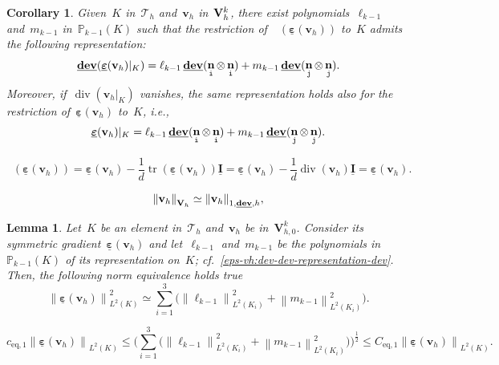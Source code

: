 \documentclass[10pt,a4paper]{amsart}
\newtheorem{lemma}{Lemma}
\newtheorem{corollary}{Corollary}
\newcommand{\Ceqone}{C_{\text{eq},1}}
\newcommand{\Idbf}{\underline{\mathbf{I}}}
\newcommand{\K}{K}
\newcommand{\Ki}{{\K_i}}
\newcommand{\Ltwo}{L^2}
\newcommand{\Norm}[1]{{\left\|{#1} \right\|}}
\newcommand{\Pbbkmo}{\mathbb{P}_{k-1}}
\newcommand{\Tauh}{\mathcal{T}_h}
\newcommand{\Vbf}{\mathbf{V}}
\newcommand{\Vh}{{\bf{V}}_h}
\newcommand{\Vhk}{\Vh^k}
\newcommand{\Vhkz}{\Vbf_{h,0}^k}
\newcommand{\ceqone}{c_{\text{eq},1}}
\DeclareMathOperator{\dev}{\underline{\mathbf{dev}}}
\DeclareMathOperator{\dive}{div}
\newcommand{\epsbfun}{\underline{\boldsymbol{\varepsilon}}}
\newcommand{\itt}{\mathtt{i}}
\newcommand{\jtt}{\mathtt{j}}
\newcommand{\lkmo}{\ell_{k-1}}
\newcommand{\mkmo}{m_{k-1}}
\DeclareMathOperator{\norm}{\bf{n}}
\newcommand{\normitt}{\norm_{\itt}}
\newcommand{\normjtt}{\norm_{\jtt}}
\DeclareMathOperator{\tr}{tr}
\newcommand{\vbfh}{\mathbf{v}_h}
\begin{document}
\begin{corollary} \label{corollary:decomposition-epsvh}
Given~$\K$ in~$\Tauh$
and~$\vbfh$ in~$\Vhk$,
there exist polynomials~$\lkmo$ and~$\mkmo$ in~$\Pbbkmo(\K)$
such that the restriction of~$\dev(\epsbfun(\vbfh))$ to~$\K$
admits the following representation:
\begin{equation} \label{eps-vh:dev-dev-representation-dev}
\dev(\epsbfun(\vbfh)|_{\K}) = \lkmo \dev(\normitt\otimes\normitt) + \mkmo \dev(\normjtt\otimes\normjtt).
\end{equation}
Moreover,
if~$\dive(\vbfh|_{\K})$ vanishes,
the same representation holds also for the restriction of~$\epsbfun(\vbfh)$ to~$\K$, i.e.,
\begin{equation} \label{eps-vh:dev-dev-representation}
\epsbfun(\vbfh)|_{\K} = \lkmo \dev(\normitt\otimes\normitt) + \mkmo \dev(\normjtt\otimes\normjtt).
\end{equation}
\end{corollary}

\begin{equation} \label{deveps-equal-eps}
\dev(\epsbfun(\vbfh))
= \epsbfun(\vbfh) - \frac{1}{d}\tr(\epsbfun(\vbfh)) \Idbf 
= \epsbfun(\vbfh) - \frac{1}{d}\dive(\vbfh) \Idbf 
= \epsbfun(\vbfh).
\end{equation}

\begin{equation} \label{norm-equivalence-h-dev}
\Norm{\vbfh}_{\Vh} \simeq \Norm{\vbfh}_{1,\dev,h},
\end{equation}

\begin{lemma} \label{lemma:norm-equivalence}
Let~$\K$ be an element in~$\Tauh$
and~$\vbfh$ be in~$\Vhkz$.
Consider its symmetric gradient~$\epsbfun(\vbfh)$
and let~$\lkmo$ and~$\mkmo$ be the polynomials in~$\Pbbkmo(\K)$
of its representation on~$\K$; cf.~\eqref{eps-vh:dev-dev-representation-dev}.
Then,
the following norm equivalence holds true
\begin{equation} \label{norm-equivalence:statement}
\Norm{\epsbfun(\vbfh)}_{\Ltwo(\K)}^2
\simeq \sum_{i = 1}^3\big(\Norm{\lkmo}_{\Ltwo(\Ki)}^2 + \Norm{\mkmo}_{\Ltwo(\Ki)}^2\big).
\end{equation}
\end{lemma}

\begin{equation} \label{norm-equivalence:explicit-constants}
\ceqone\Norm{\epsbfun(\vbfh)}_{\Ltwo(\K)}
\leq \Big(\sum_{i = 1}^3\big(\Norm{\lkmo}_{\Ltwo(\Ki)}^2 + \Norm{\mkmo}_{\Ltwo(\Ki)}^2\big)\Big)^{\frac12}
\leq \Ceqone\Norm{\epsbfun(\vbfh)}_{\Ltwo(\K)}.
\end{equation}
\end{document}
